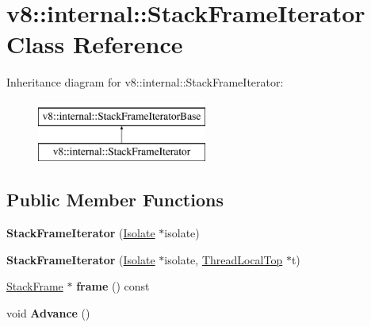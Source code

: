 \hypertarget{classv8_1_1internal_1_1StackFrameIterator}{}\section{v8\+:\+:internal\+:\+:Stack\+Frame\+Iterator Class Reference}
\label{classv8_1_1internal_1_1StackFrameIterator}
Inheritance diagram for v8\+:\+:internal\+:\+:Stack\+Frame\+Iterator\+:\begin{figure}[H]
\begin{center}
\leavevmode
\includegraphics[height=2.000000cm]{classv8_1_1internal_1_1StackFrameIterator}
\end{center}
\end{figure}
\subsection*{Public Member Functions}
\begin{DoxyCompactItemize}
\item 
\mbox{\label{classv8_1_1internal_1_1StackFrameIterator_af08ff5917984721e9d3b0ea498d19333}} 
{\bfseries Stack\+Frame\+Iterator} (\mbox{\hyperlink{classv8_1_1internal_1_1Isolate}{Isolate}} $\ast$isolate)
\item 
\mbox{\label{classv8_1_1internal_1_1StackFrameIterator_a4f429dd1f6d793ed89d1a34c25335644}} 
{\bfseries Stack\+Frame\+Iterator} (\mbox{\hyperlink{classv8_1_1internal_1_1Isolate}{Isolate}} $\ast$isolate, \mbox{\hyperlink{classv8_1_1internal_1_1ThreadLocalTop}{Thread\+Local\+Top}} $\ast$t)
\item 
\mbox{\label{classv8_1_1internal_1_1StackFrameIterator_a43fb614966eec5b43b038ded87711b5b}} 
\mbox{\hyperlink{classv8_1_1internal_1_1StackFrame}{Stack\+Frame}} $\ast$ {\bfseries frame} () const
\item 
\mbox{\label{classv8_1_1internal_1_1StackFrameIterator_a50d8031f727ca2701312000d790e4b19}} 
void {\bfseries Advance} ()
\end{DoxyCompactItemize}
